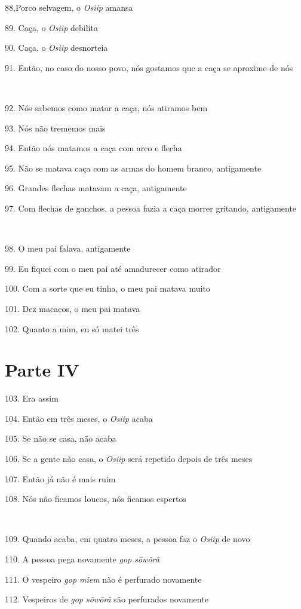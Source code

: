 88,Porco selvagem, o \emph{Osiip} amansa

89. Caça, o \emph{Osiip} debilita

90. Caça, o \emph{Osiip} desnorteia

91. Então, no caso do nosso povo, nós gostamos que a caça se aproxime de nós

~

92. Nós sabemos como matar a caça, nós atiramos bem

93. Nós não trememos mais

94. Então nós matamos a caça com arco e flecha

95. Não se matava caça com as armas do homem branco, antigamente

96. Grandes flechas matavam a caça, antigamente

97. Com flechas de ganchos, a pessoa fazia a caça morrer gritando, antigamente

~

98. O meu pai falava, antigamente

99. Eu fiquei com o meu pai até amadurecer como atirador

100. Com a sorte que eu tinha, o meu pai matava muito

101. Dez macacos, o meu pai matava

102. Quanto a mim, eu só matei três

\section{Parte IV}

103. Era assim

104. Então em três meses, o \emph{Osiip} acaba

105. Se não se casa, não acaba

106. Se a gente não casa, o \emph{Osiip} será repetido depois de três meses

107. Então já não é mais ruim

108. Nós não ficamos loucos, nós ficamos espertos

~

109. Quando acaba, em quatro meses, a pessoa faz o \emph{Osiip} de novo

110. A pessoa pega novamente \emph{gop sõwõrã}

111. O vespeiro \emph{gop miem} não é perfurado novamente

112. Vespeiros de \emph{gop sõwõrã} são perfurados novamente

~


